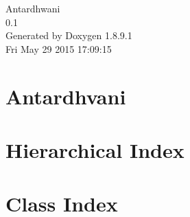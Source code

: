 \documentclass[twoside]{book}
\newcommand{\+}{\discretionary{\mbox{\scriptsize$\hookleftarrow$}}{}{}}
\newcommand{\clearemptydoublepage}{%
  \newpage{\pagestyle{empty}\cleardoublepage}%
}
\begin{document}
\hypersetup{pageanchor=false,
             bookmarks=true,
             bookmarksnumbered=true,
             pdfencoding=unicode
            }
\begin{titlepage}
\vspace*{7cm}
\begin{center}%
{\Large Antardhwani \\[1ex]\large 0.\+1 }\\
\vspace*{1cm}
{\large Generated by Doxygen 1.8.9.1}\\
\vspace*{0.5cm}
{\small Fri May 29 2015 17:09:15}\\
\end{center}
\end{titlepage}
\clearemptydoublepage
\tableofcontents
\clearemptydoublepage
{}
\hypersetup{pageanchor=true}

\chapter{Antardhvani}
\label{md__r_e_a_d_m_e}
\hypertarget{md__r_e_a_d_m_e}{}

\chapter{Hierarchical Index}

\chapter{Class Index}

\end{document}
